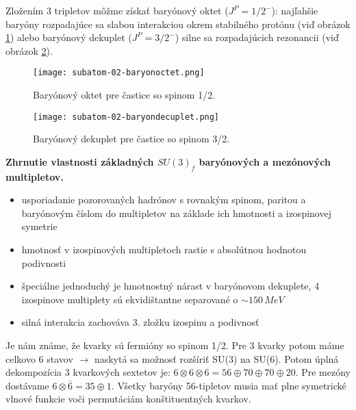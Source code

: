 \documentclass[../../main.tex]{subfiles}
\begin{document}
Zložením 3 tripletov môžme získať baryónový oktet ($J^P=1/2^{-}$): najľahšie baryóny rozpadajúce sa slabou interakciou okrem stabilného protónu (viď obrázok \ref{sf2:fig:baryonoctet}) alebo baryónový dekuplet ($J^P=3/2^{-}$) silne sa rozpadajúcich rezonancii (viď obrázok \ref{sf2:fig:baryondecuplet}). 

\begin{figure}[!h]
\texttt{[image: subatom-02-baryonoctet.png]}
\centering
\caption{Baryónový oktet pre častice so spinom 1/2.}
\label{sf2:fig:baryonoctet}
\end{figure}

\begin{figure}[!h]
\texttt{[image: subatom-02-baryondecuplet.png]}
\centering
\caption{Baryónový dekuplet pre častice so spinom 3/2.}
\label{sf2:fig:baryondecuplet}
\end{figure}

\textbf{Zhrnutie vlastnosti základných $SU(3)_f$ baryónových a mezónových multipletov.}
\begin{itemize}
\item usporiadanie pozorovaných hadrónov s rovnakým spinom, paritou a baryónovým číslom do multipletov na základe ich hmotnosti a izospinovej symetrie
\item hmotnosť v izospinových multipletoch rastie s absolútnou hodnotou podivnosti
\item špeciálne jednoduchý je hmotnostný nárast v baryónovom dekuplete, 4 izospinove multiplety sú ekvidištantne separované o $\sim 150\,MeV$ 
\item silná interakcia zachováva 3. zložku izospinu a podivnosť 
\end{itemize}

Je nám známe, že kvarky sú fermióny so spinom 1/2. Pre 3 kvarky potom máme celkovo 6 stavov $\rightarrow$ naskytá sa možnosť rozšíriť SU(3) na SU(6). Potom úplná dekompozícia 3 kvarkových sextetov je:
$6 \otimes 6 \otimes 6 = 56 \oplus 70 \oplus 70 \oplus 20 $. Pre mezóny dostávame $6 \otimes \bar{6} = 35 \oplus 1$. Všetky baryóny 56-tipletov musia mať plne symetrické vlnové funkcie voči permutáciám konštituentných kvarkov.\newline
\end{document}
